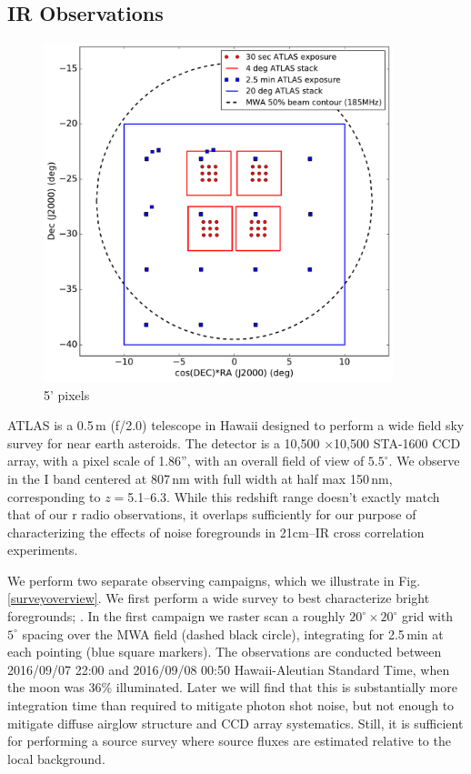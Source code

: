 \documentclass[preprint]{aastex}
\begin{document}
\subsection{IR Observations}

\begin{figure}[h]
\centering
\includegraphics[width=4in]{images/survey_overview.pdf}
\caption{5' pixels}
\label{fig:surveyoverview}
\end{figure}

ATLAS is a 0.5\,m (f/2.0) telescope \citep{tonry11} in Hawaii designed to perform a wide field sky survey for near earth asteroids. The detector is a 10,500 $\times$10,500 STA-1600 CCD array, with a pixel scale of 1.86'', with an overall field of view of $5.5^\circ$. We observe in the I band centered at 807\,nm with full width at half max 150\,nm, corresponding to $z=$5.1--6.3. While this redshift range doesn't exactly match that of our r radio observations, it overlaps sufficiently for our purpose of characterizing the effects of noise foregrounds in 21cm--IR cross correlation experiments. 

We perform two separate observing campaigns, which we illustrate in Fig. \ref{surveyoverview}. We first perform a wide survey to best characterize bright foregrounds; . In the first campaign we raster scan a roughly $20^\circ\times20^\circ$ grid with $5^\circ$ spacing over the MWA field (dashed black circle), integrating for 2.5\,min at each pointing (blue square markers). The observations are conducted between 2016/09/07 22:00  and 2016/09/08 00:50 Hawaii-Aleutian Standard Time, when the moon was 36\% illuminated.  Later we will find that this is substantially more integration time than required to mitigate photon shot noise, but not enough to mitigate diffuse airglow structure and CCD array systematics. Still, it is sufficient for performing a source survey where source fluxes are estimated relative to the local background. 
\end{document}
